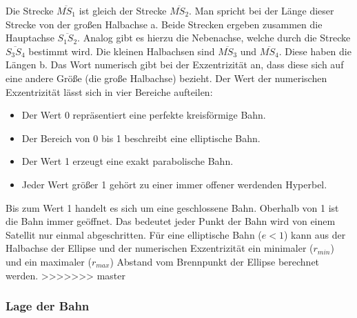 Die Strecke \ensuremath{\overline{MS_{1}}} ist gleich der Strecke \ensuremath{\overline{MS_{2}}}. Man spricht bei der Länge dieser Strecke von der großen Halbachse a. Beide Strecken ergeben zusammen die Hauptachse \ensuremath{\overline{S_{1}S_{2}}}. Analog gibt es hierzu die Nebenachse, welche durch die Strecke \ensuremath{\overline{S_{3}S_{4}}} bestimmt wird. Die kleinen Halbachsen sind \ensuremath{\overline{MS_{3}}} und \ensuremath{\overline{MS_{4}}}. Diese haben die Längen b.  Das Wort numerisch gibt bei der Exzentrizität an, dass diese sich auf eine andere Größe (die große Halbachse) bezieht. Der Wert der numerischen Exzentrizität lässt sich in vier Bereiche aufteilen: 
\begin{itemize}
	\item Der Wert 0 repräsentiert eine perfekte kreisförmige Bahn.
	\item Der Bereich von 0 bis 1 beschreibt eine elliptische Bahn.
	\item Der Wert 1 erzeugt eine exakt parabolische Bahn.
	\item Jeder Wert größer 1 gehört zu einer immer offener werdenden Hyperbel.  
\end{itemize}   

Bis zum Wert 1 handelt es sich um eine geschlossene Bahn. Oberhalb von 1 ist die Bahn immer geöffnet. Das bedeutet jeder Punkt der Bahn wird von einem Satellit nur einmal abgeschritten. Für eine elliptische Bahn (\ensuremath{e < 1}) kann aus der Halbachse der Ellipse und der numerischen Exzentrizität ein minimaler (\ensuremath{r_{min}}) und ein maximaler (\ensuremath{r_{max}}) Abstand vom Brennpunkt der Ellipse berechnet werden.     
>>>>>>> master

\subsubsection*{Lage der Bahn}



